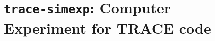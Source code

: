 \chapter[\texttt{trace-simexp}]{\texttt{trace-simexp}: Computer Experiment for TRACE code}
\label{app:trace_simexp}
